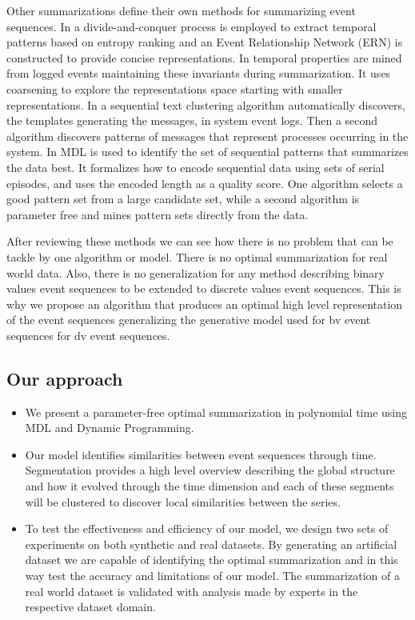 Other summarizations define their own methods for summarizing event sequences. In \cite{Peng:2007} a divide-and-conquer process is employed to extract temporal patterns based on entropy ranking and an Event Relationship Network (ERN) is constructed to provide concise representations. In \cite{Schneider:2010} temporal properties are mined from logged events maintaining these invariants during summarization. It uses coarsening to explore the representations space starting with smaller representations. In \cite{Aharon:2009} a sequential text clustering algorithm automatically discovers, the templates generating the messages, in system event logs. Then a second algorithm discovers patterns of messages that represent processes occurring in the system. In \cite{Tatti:2012} MDL is used to identify the set of sequential patterns that summarizes the data best. It formalizes how to encode sequential data using sets of serial episodes,
and uses the encoded length as a quality score. One algorithm selects a good pattern set from a large candidate set, while a second algorithm is parameter free and mines pattern sets directly from the data. 

After reviewing these methods we can see how there is no problem that can be tackle by one algorithm or model. There is no optimal summarization for real world data. Also, there is no generalization for any method describing binary values event sequences to be extended to discrete values event sequences. This is why we propose an algorithm that produces an optimal high level representation of the event sequences generalizing the generative model used for bv event sequences for dv event sequences.


\subsection{Our approach}
\begin{itemize}
\item We present a parameter-free optimal summarization in polynomial time using MDL and Dynamic Programming.
\item Our model identifies similarities between event sequences through time. Segmentation provides a high level overview describing the global structure and how it evolved through the time dimension and each of these segments will be clustered to discover local similarities between the series.
\item To test the effectiveness and efficiency of our model, we design two sets of experiments on both synthetic and real datasets. By generating an artificial dataset we are capable of identifying the optimal summarization and in this way test the accuracy and limitations of our model. The summarization of a real world dataset is validated with analysis made by experts in the respective dataset domain.
\end{itemize}

